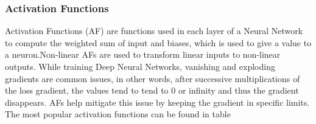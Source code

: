 \subsubsection{Activation Functions}

Activation Functions (AF) are functions used in each layer of a Neural Network to compute the weighted sum of input and biases,
which is used to give a value to a neuron.Non-linear AFs are used to transform linear inputs to non-linear outputs.
 While training Deep Neural Networks, vanishing and exploding gradients
are common issues, in other words, after successive multiplications of the loss gradient, the values tend to tend to 0 or infinity and thus the gradient disappears.
AFs help mitigate this issue by keeping the gradient in specific limits. The most popular activation functions can be found in table


\begin{table}[]
    \centering
    \resizebox{.6\textwidth}{!}{%
    \begin{tabular}{ll}
    \hline
    \textbf{Activation Functions} & \textbf{Computation Equation} \\ \hline \hline
    Sigmoid                       &  $\displaystyle f(x)=\frac{1}{1+ e^{-x}}$                             \\ \hline
    Tanh                          &  $\displaystyle f(x)=\frac{e^{x}-e^{-x}}{e^{x}+e^{-x}}$                            \\ \hline
    Softmax                       &  $\displaystyle f(x_{i})=\frac{x_{i}}{\sum_{j}e^{x_{j}}}$                             \\ \hline
    ReLU                          &    $ f(x)=\begin{matrix}
        x & if & x\geq 0  \\ 
        0 & if & x< 0 
    \end{matrix} $                           \\ \hline
    LReLU                         &  $f(x)= \begin{matrix}
        x & if & x > 0  \\ 
        \alpha x & if & x \leq 0 
    \end{matrix} $                        \\ \hline
    ELU                           &             $ f(x)=\begin{matrix}
        x & if & x> 0  \\ 
        \alpha e^{x} - 1 & if & x\leq 0 
    \end{matrix} $                 \\ \hline
    \end{tabular}%
    }
    \caption{Popular Activation functions}
    \label{table:AF}
\end{table}



